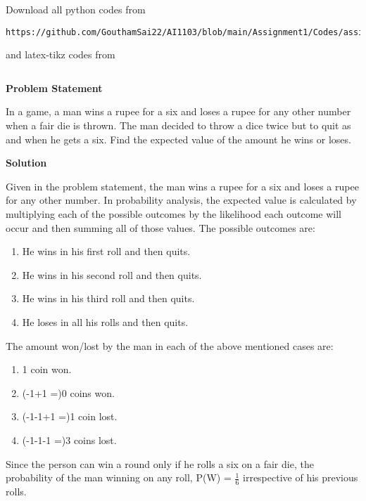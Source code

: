 \documentclass[journal,12pt,twocolumn]{IEEEtran}
\begin{document}
\maketitle
\newpage
\bigskip
\renewcommand{\thefigure}{\theenumi}
\renewcommand{\thetable}{\theenumi}
Download all python codes from 
\begin{lstlisting}
https://github.com/GouthamSai22/AI1103/blob/main/Assignment1/Codes/assign1.py
\end{lstlisting}
%
and latex-tikz codes from 
%
\begin{lstlisting}

\end{lstlisting}
\begin{center}
   \textbf{Problem Statement} 
\end{center}
In a game, a man wins a rupee for a six and loses a rupee for any other number when a fair die is thrown. The man decided to throw a dice twice but to quit as and when he gets a six. Find the expected value of the amount he wins or loses.
\begin{center}
    \textbf{Solution}
\end{center}
Given in the problem statement, the man wins a rupee for a six and loses a rupee for any other number. In probability analysis, the expected value is calculated by multiplying each of the possible outcomes by the likelihood each outcome will occur and then summing all of those values. The possible outcomes are:
\begin{enumerate}
    \item He wins in his first roll and then quits.
    \item He wins in his second roll and then quits.
    \item He wins in his third roll and then quits.
    \item He loses in all his rolls and then quits.
\end{enumerate}
The amount won/lost by the man in each of the above mentioned cases are:
\begin{enumerate}
    \item 1 coin won.
    \item (-1+1 =)0 coins won.
    \item (-1-1+1 =)1 coin lost.
    \item (-1-1-1 =)3 coins lost.
\end{enumerate}
Since the person can win a round only if he rolls a six on a fair die, the probability of the man winning on any roll, P(W) = $\frac{1}{6}$ irrespective of his previous rolls.\newline
\end{document}
